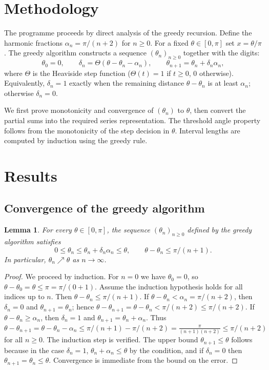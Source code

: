 \documentclass[11pt,a4paper]{article}
\newtheorem{lemma}[theorem]{Lemma}
\begin{document}
\section{Methodology}
The programme proceeds by direct analysis of the greedy recursion.  Define the harmonic fractions \(\alpha_n = \pi/(n+2)\) for \(n\ge 0\).  For a fixed \(\theta\in[0,\pi]\) set \(x = \theta/\pi\).  The greedy algorithm constructs a sequence \((\theta_n)_{n\ge 0}\) together with the digits:
\[
\theta_0 = 0,\qquad
\delta_n = \Theta(\theta - \theta_n - \alpha_n),\qquad
\theta_{n+1} = \theta_n + \delta_n\alpha_n,
\]
where \(\Theta\) is the Heaviside step function (\(\Theta(t)=1\) if \(t\ge 0\), \(0\) otherwise).  Equivalently, \(\delta_n = 1\) exactly when the remaining distance \(\theta - \theta_n\) is at least \(\alpha_n\); otherwise \(\delta_n = 0\).

We first prove monotonicity and convergence of \((\theta_n)\) to \(\theta\), then convert the partial sums into the required series representation.  The threshold angle property follows from the monotonicity of the step decision in \(\theta\).  Interval lengths are computed by induction using the greedy rule.

\section{Results}

\subsection{Convergence of the greedy algorithm}

\begin{lemma}\label{lem:convergence}
For every \(\theta\in[0,\pi]\), the sequence \((\theta_n)_{n\ge 0}\) defined by the greedy algorithm satisfies
\[
0\le \theta_n \le \theta_n + \delta_n\alpha_n \le \theta,\qquad
\theta - \theta_n \le \pi/(n+1).
\]
In particular, \(\theta_n \nearrow \theta\) as \(n\to\infty\).
\end{lemma}

\begin{proof}
We proceed by induction.  For \(n=0\) we have \(\theta_0=0\), so \(\theta-\theta_0 = \theta \le \pi = \pi/(0+1)\).  Assume the induction hypothesis holds for all indices up to \(n\).  Then \(\theta - \theta_n \le \pi/(n+1)\).  If \(\theta - \theta_n < \alpha_n = \pi/(n+2)\), then \(\delta_n = 0\) and \(\theta_{n+1} = \theta_n\); hence \(\theta-\theta_{n+1} = \theta-\theta_n < \pi/(n+2) \le \pi/(n+2)\).  If \(\theta - \theta_n \ge \alpha_n\), then \(\delta_n = 1\) and \(\theta_{n+1} = \theta_n + \alpha_n\).  Thus \(\theta - \theta_{n+1} = \theta - \theta_n - \alpha_n \le \pi/(n+1) - \pi/(n+2) = \frac{\pi}{(n+1)(n+2)} \le \pi/(n+2)\) for all \(n\ge0\).  The induction step is verified.  The upper bound \(\theta_{n+1}\le\theta\) follows because in the case \(\delta_n=1\), \(\theta_n+\alpha_n\le \theta\) by the condition, and if \(\delta_n=0\) then \(\theta_{n+1}=\theta_n\le\theta\).  Convergence is immediate from the bound on the error.
\end{proof}
\end{document}
